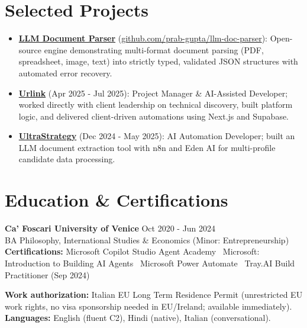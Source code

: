 \documentclass[a4paper,10pt]{article}
\begin{document}
\section{Selected Projects}
\begin{itemize}
  \item \textbf{\href{https://github.com/prab-gupta/llm-doc-parser}{LLM Document Parser}} (\href{https://github.com/prab-gupta/llm-doc-parser}{github.com/prab-gupta/llm-doc-parser}): Open-source engine demonstrating multi-format document parsing (PDF, spreadsheet, image, text) into strictly typed, validated JSON structures with automated error recovery.
  \item \textbf{\href{https://smarturlink.com/}{Urlink}} (Apr 2025 - Jul 2025): Project Manager \& AI-Assisted Developer; worked directly with client leadership on technical discovery, built platform logic, and delivered client-driven automations using Next.js and Supabase.
  \item \textbf{\href{https://ultrastrategy.com}{UltraStrategy}} (Dec 2024 - May 2025): AI Automation Developer; built an LLM document extraction tool with n8n and Eden AI for multi-profile candidate data processing.
\end{itemize}

\section{Education \& Certifications}
\textbf{Ca' Foscari University of Venice} \hfill Oct 2020 - Jun 2024\\
BA Philosophy, International Studies \& Economics (Minor: Entrepreneurship)\\[1pt]
\textbf{Certifications:} Microsoft Copilot Studio Agent Academy \textbullet\ Microsoft: Introduction to Building AI Agents \textbullet\ Microsoft Power Automate \textbullet\ Tray.AI Build Practitioner (Sep 2024)

\vspace{2pt}
{\small \textbf{Work authorization:} Italian EU Long Term Residence Permit (unrestricted EU work rights, no visa sponsorship needed in EU/Ireland; available immediately). \quad \textbf{Languages:} English (fluent C2), Hindi (native), Italian (conversational).}
\end{document}
